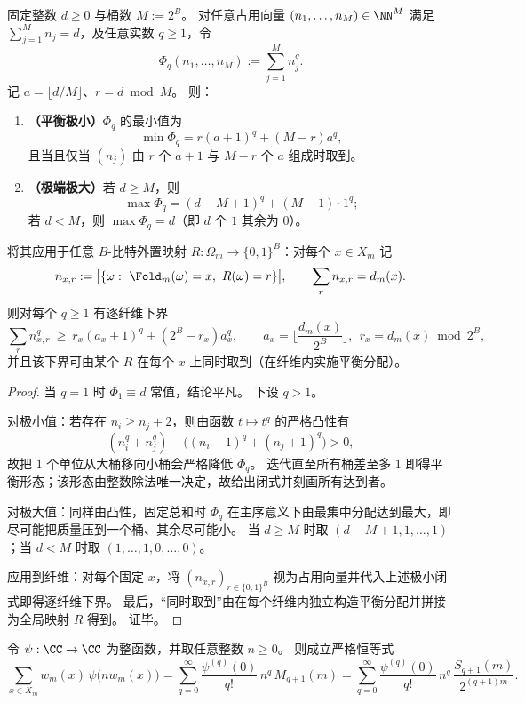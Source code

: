 \begin{theorem}\label{thm:pom-remainder-bits-renyi-collision-extremal}
固定整数 \(d\ge 0\) 与桶数 \(M:=2^B\)。
对任意占用向量 \((n_1,\dots,n_M)\in\NN^M\) 满足 \(\sum_{j=1}^M n_j=d\)，及任意实数 \(q\ge 1\)，令
\[
\Phi_q(n_1,\dots,n_M):=\sum_{j=1}^{M} n_j^q.
\]
记 \(a=\lfloor d/M\rfloor\)、\(r=d\bmod M\)。
则：
\begin{enumerate}
  \item \textbf{（平衡极小）}\(\Phi_q\) 的最小值为
  \[
  \min\Phi_q=r(a+1)^q+(M-r)a^q,
  \]
  且当且仅当 \((n_j)\) 由 \(r\) 个 \(a+1\) 与 \(M-r\) 个 \(a\) 组成时取到。
  \item \textbf{（极端极大）}若 \(d\ge M\)，则
  \[
  \max\Phi_q=(d-M+1)^q+(M-1)\cdot 1^q;
  \]
  若 \(d<M\)，则 \(\max\Phi_q=d\)（即 \(d\) 个 \(1\) 其余为 \(0\)）。
\end{enumerate}
将其应用于任意 \(B\)-比特外置映射 \(R:\Omega_m\to\{0,1\}^B\)：对每个 \(x\in X_m\) 记
\[
n_{x,r}:=\bigl|\{\omega:\ \Fold_m(\omega)=x,\ R(\omega)=r\}\bigr|,
\qquad \sum_r n_{x,r}=d_m(x).
\]
则对每个 \(q\ge 1\) 有逐纤维下界
\[
\sum_r n_{x,r}^q\ \ge\ r_x(a_x+1)^q+(2^B-r_x)a_x^q,
\qquad
a_x=\Big\lfloor\frac{d_m(x)}{2^B}\Big\rfloor,\ \ r_x=d_m(x)\bmod 2^B,
\]
并且该下界可由某个 \(R\) 在每个 \(x\) 上同时取到（在纤维内实施平衡分配）。
\end{theorem}
\begin{proof}
当 \(q=1\) 时 \(\Phi_1\equiv d\) 常值，结论平凡。
下设 \(q>1\)。
\par
对极小值：若存在 \(n_i\ge n_j+2\)，则由函数 \(t\mapsto t^q\) 的严格凸性有
\[
(n_i^q+n_j^q)-\bigl((n_i-1)^q+(n_j+1)^q\bigr)>0,
\]
故把 \(1\) 个单位从大桶移向小桶会严格降低 \(\Phi_q\)。
迭代直至所有桶差至多 \(1\) 即得平衡形态；该形态由整数除法唯一决定，故给出闭式并刻画所有达到者。
\par
对极大值：同样由凸性，固定总和时 \(\Phi_q\) 在主序意义下由最集中分配达到最大，即尽可能把质量压到一个桶、其余尽可能小。
当 \(d\ge M\) 时取 \((d-M+1,1,\dots,1)\)；当 \(d<M\) 时取 \((1,\dots,1,0,\dots,0)\)。
\par
应用到纤维：对每个固定 \(x\)，将 \((n_{x,r})_{r\in\{0,1\}^B}\) 视为占用向量并代入上述极小闭式即得逐纤维下界。
最后，“同时取到”由在每个纤维内独立构造平衡分配并拼接为全局映射 \(R\) 得到。
证毕。
\end{proof}

\begin{theorem}[解析占用泛函的碰撞矩展开律]\label{thm:pom-occupancy-functional-collision-expansion}
令 \(\psi:\CC\to\CC\) 为整函数，并取任意整数 \(n\ge 0\)。
则成立严格恒等式
\[
\sum_{x\in X_m} w_m(x)\,\psi\!\bigl(n w_m(x)\bigr)
=\sum_{q=0}^{\infty}\frac{\psi^{(q)}(0)}{q!}\,n^q\,M_{q+1}(m)
=\sum_{q=0}^{\infty}\frac{\psi^{(q)}(0)}{q!}\,n^q\,\frac{S_{q+1}(m)}{2^{(q+1)m}}.
\]
\end{theorem}

